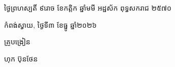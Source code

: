 \documentclass[a4paper,10pt]{article}
\begin{document}
\vspace{6pt}
{\centering
\hspace*{5.2cm}\begin{minipage}{11.5cm}
  \centering
  ថ្ងៃព្រហស្បតិ៍ ៩រោច ខែកត្តិក ឆ្នាំមមី អដ្ឋស័ក ពុទ្ធសករាជ ២៥៧០\par
  កំពង់ស្វាយ, ថ្ងៃទី៣ ខែធ្នូ ឆ្នាំ២០២៦\par
  \vspace{2pt}
  {\muol គ្រូបង្រៀន\par}
  \vspace{32pt}
  \hfill{\muol ហុក ប៊ុនថែន}\hspace*{1.4cm}
\end{minipage}\par}
\end{document}
